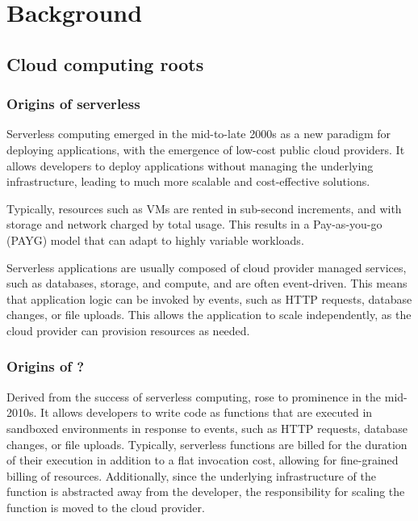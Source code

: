 \chapter{Background}

\section{Cloud computing roots}
\subsection{Origins of serverless}
Serverless computing emerged in the mid-to-late 2000s\cite{wardleyWardleyMaps2022,IntroducingGoogleApp,patilServerlessComputingEmergence2021} as a new paradigm for deploying applications, with the emergence of low-cost public cloud providers\cite{patilServerlessComputingEmergence2021,BenjaminBlackEC2}. It allows developers to deploy applications without managing the underlying infrastructure, leading to much more scalable and cost-effective solutions.

Typically, resources such as VMs\cite{hoeferTaxonomyCloudComputing2010} are rented in sub-second increments, and with storage and network charged by total usage. This results in a Pay-as-you-go (PAYG) model that can adapt to highly variable workloads\cite{sehgalCostBillingPractices2023,hilleyCloudComputingTaxonomy2009}.

Serverless applications are usually composed of cloud provider managed services, such as databases, storage, and compute, and are often event-driven\cite{EventarcOverview,EventListenerAmazon,robeceOverviewAzureEvent2024}. This means that application logic can be invoked by events, such as HTTP requests, database changes, or file uploads. This allows the application to scale independently\cite{goniwadaCloudNativeArchitecture2022}, as the cloud provider can provision resources as needed.

\subsection{Origins of \faas{}?}
Derived from the success of serverless computing, \faas{} rose to prominence in the mid-2010s\cite{AmazonWebServices2014,azureAnnouncingGeneralAvailability2016}. It allows developers to write code as functions that are executed in sandboxed environments in response to events, such as HTTP requests, database changes, or file uploads\cite{EventarcOverview,EventListenerAmazon,robeceOverviewAzureEvent2024}. Typically, serverless functions are billed for the duration of their execution in addition to a flat invocation cost, allowing for fine-grained billing of resources\cite{bortoliniInvestigatingPerformanceCost2020}. Additionally, since the underlying infrastructure of the function is abstracted away from the developer, the responsibility for scaling the function is moved to the cloud provider.

